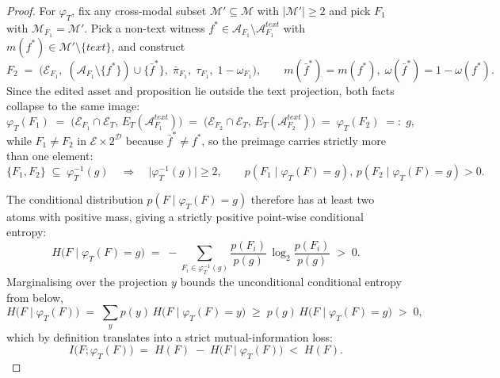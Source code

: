 \documentclass{article}
\begin{document}
\begin{proof}
For $\varphi_T$, fix any cross-modal subset $\mathcal{M}'\!\subseteq\!\mathcal{M}$ with $|\mathcal{M}'|\!\geq\!2$ and pick $F_1$ with $\mathcal{M}_{F_1}\!=\!\mathcal{M}'$. Pick a non-text witness $f^{*}\!\in\!\mathcal{A}_{F_1}\!\setminus\!\mathcal{A}_{F_1}^{\textit{text}}$ with $m(f^{*})\!\in\!\mathcal{M}'\!\setminus\!\{\textit{text}\}$, and construct
\begin{equation}
F_2\;=\;\bigl(\mathcal{E}_{F_1},\;(\mathcal{A}_{F_1}\!\setminus\!\{f^{*}\})\!\cup\!\{\bar{f}^{*}\},\;\bar{\pi}_{F_1},\;\tau_{F_1},\;1\!-\!\omega_{F_1}\bigr),\qquad m(\bar{f}^{*})\!=\!m(f^{*}),\;\omega(\bar{f}^{*})\!=\!1\!-\!\omega(f^{*}).
\label{eq:p1-construct}
\end{equation}
Since the edited asset and proposition lie outside the text projection, both facts collapse to the same image:
\begin{equation}
\varphi_T(F_1)\;=\;\bigl(\mathcal{E}_{F_1}\!\cap\!\mathcal{E}_T,\,E_T(\mathcal{A}_{F_1}^{\textit{text}})\bigr)\;=\;\bigl(\mathcal{E}_{F_2}\!\cap\!\mathcal{E}_T,\,E_T(\mathcal{A}_{F_2}^{\textit{text}})\bigr)\;=\;\varphi_T(F_2)\;=:\;g,
\label{eq:p1-collide-img}
\end{equation}
while $F_1\!\neq\!F_2$ in $\mathcal{E}\!\times\!2^{\mathcal{D}}$ because $\bar{f}^{*}\!\neq\!f^{*}$, so the preimage carries strictly more than one element:
\begin{equation}
\{F_1,F_2\}\;\subseteq\;\varphi_T^{-1}(g)\quad\Longrightarrow\quad\bigl|\varphi_T^{-1}(g)\bigr|\!\geq\!2,\qquad p(F_1\!\mid\!\varphi_T(F)\!=\!g),\,p(F_2\!\mid\!\varphi_T(F)\!=\!g)\!>\!0.
\label{eq:p1-collide}
\end{equation}

The conditional distribution $p(F\!\mid\!\varphi_T(F)\!=\!g)$ therefore has at least two atoms with positive mass, giving a strictly positive point-wise conditional entropy:
\begin{equation}
H\!\bigl(F\!\mid\!\varphi_T(F)\!=\!g\bigr)\;=\;-\!\!\sum_{F_i\in\varphi_T^{-1}(g)}\!\!\frac{p(F_i)}{p(g)}\,\log_2\!\frac{p(F_i)}{p(g)}\;>\;0.
\label{eq:p1-Hpoint}
\end{equation}
Marginalising over the projection $y$ bounds the unconditional conditional entropy from below,
\begin{equation}
H\!\bigl(F\!\mid\!\varphi_T(F)\bigr)\;=\;\sum_{y}p(y)\,H\!\bigl(F\!\mid\!\varphi_T(F)\!=\!y\bigr)\;\geq\;p(g)\,H\!\bigl(F\!\mid\!\varphi_T(F)\!=\!g\bigr)\;>\;0,
\label{eq:p1-Hmarg}
\end{equation}
which by definition translates into a strict mutual-information loss:
\begin{equation}
I\!\bigl(F;\varphi_T(F)\bigr)\;=\;H(F)\;-\;H\!\bigl(F\!\mid\!\varphi_T(F)\bigr)\;<\;H(F).
\label{eq:p1-Iloss}
\end{equation}


\end{proof}
\end{document}
